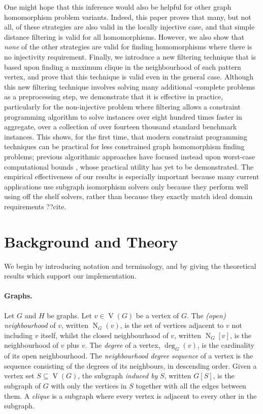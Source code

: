 \documentclass{article}
\newcommand{\neighbourhood}{\operatorname{N}}
\newcommand{\vertexset}{\operatorname{V}}
\newcommand{\degree}{\operatorname{deg}}
\begin{document}
One might hope that this inference would also be helpful for other graph homomorphism problem
variants. Indeed, this paper proves that many, but not all, of these strategies are also valid in
the locally injective case, and that simple distance filtering is valid for all homomorphisms.
However, we also show that \emph{none} of the other strategies are valid for finding homomorphisms
where there is no injectivity requirement. Finally, we introduce a new filtering technique that is
based upon finding a maximum clique in the neighbourhood of each pattern vertex, and prove that this
technique is valid even in the general case. Although this new filtering technique involves solving
many additional \NP-complete problems as a preprocessing step, we demonstrate that it is effective
in practice, particularly for the non-injective problem where filtering allows a constraint
programming algorithm to solve instances over eight hundred times faster in aggregate, over a
collection of over fourteen thousand standard benchmark instances. This shows, for the first time,
that modern constraint programming techniques can be practical for less constrained graph
homomorphism finding problems; previous algorithmic approaches have focused instead upon worst-case
computational bounds
\cite{DBLP:journals/csr/FialaK08,DBLP:journals/ipl/Rzazewski14,DBLP:journals/tcs/ChaplickFHPT15},
whose practical utility has yet to be demonstrated. The empirical effectiveness of our results is
especially important because many current applications use subgraph isomorphism solvers only because
they perform well using off the shelf solvers, rather than because they exactly match ideal domain
requirements ??cite.

\section{Background and Theory}

We begin by introducing notation and terminology, and by giving the theoretical results which
support our implementation.

\paragraph{Graphs.} Let $G$ and $H$ be graphs. Let $v \in \vertexset(G)$ be a vertex of $G$. The
\emph{(open) neighbourhood} of $v$, written $\neighbourhood_G(v)$, is the set of vertices adjacent
to $v$ not including $v$ itself, whilst the closed neighbourhood of $v$, written
$\neighbourhood_G[v]$, is the neighbourhood of $v$ plus $v$. The \emph{degree} of a vertex, $\degree_G(v)$,
is the cardinality of its open neighbourhood. The \emph{neighbourhood degree sequence} of a vertex
is the sequence consisting of the degrees of its neighbours, in descending order. Given a vertex set
$S \subseteq \vertexset(G)$, the subgraph \emph{induced by} $S$, written $G[S]$, is the subgraph of
$G$ with only the vertices in $S$ together with all the edges between them. A \emph{clique} is a
subgraph where every vertex is adjacent to every other in the subgraph.
\end{document}
